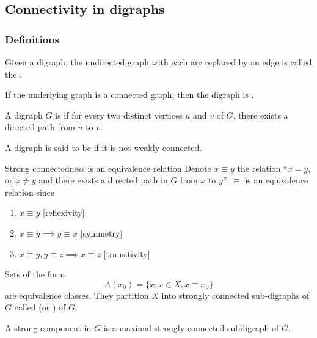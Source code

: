 \documentclass[aspectratio=43]{beamer}
\begin{document}
\subsection{Connectivity in digraphs}
\begin{frame}\frametitle{Definitions}

	\begin{definition}
	Given a digraph, the undirected graph with each arc replaced by an edge is called the .
	\end{definition}


	\begin{definition}
	If the underlying graph is a connected graph, then the digraph is .
	\end{definition}

	\begin{definition}
	A digraph $G$ is  if for every two distinct vertices $u$ and $v$ of $G$, there exists a directed path from $u$ to $v$.
	\end{definition}


	\begin{definition}
	A digraph is said to be  if it is not weakly connected.
	\end{definition}
\end{frame}

\begin{frame}{Strong connectedness is an equivalence relation}
Denote $x\equiv y$ the relation  ``$x=y$, or $x\neq y$ and there exists a directed path in $G$ from $x$ to $y$''. $\equiv$ is an equivalence relation since
\begin{enumerate}
	\item $x\equiv y$ \hfill[reflexivity]
	\item $x\equiv y\implies y\equiv x$ \hfill[symmetry]
	\item $x\equiv y, y\equiv z\implies x\equiv z$ \hfill[transitivity]
\end{enumerate}
\begin{definition}
	\label{def:strong_components}
	Sets of the form 
	\[
	A(x_0)=\{x:x\in X, x\equiv x_0\}	
	\]
	are equivalence classes. 
	They partition $X$ into strongly connected sub-digraphs of $G$ called  (or ) of $G$.
\end{definition}
A strong component in $G$ is a maximal strongly connected subdigraph of $G$.
\end{frame}
\end{document}
